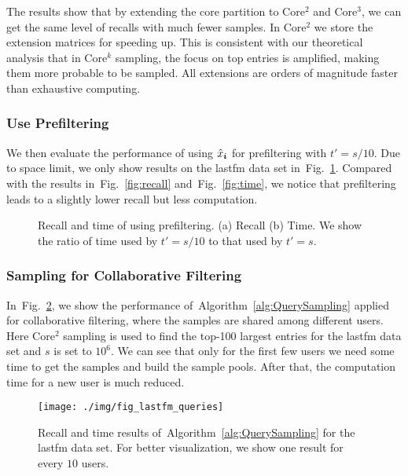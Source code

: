 \documentclass[10pt,journal,compsoc]{IEEEtran}
\newcommand{\V}[1]{{\boldsymbol{{\MakeLowercase{#1}}}}}
\newcommand{\predx}{\hat{x}_{\V{i}}}
\newcommand{\Fig}[1]{Fig.~\ref{fig:#1}}
\newcommand{\Alg}[1]{Algorithm~\ref{alg:#1}}
\begin{document}
The results show that by extending the core partition to Core$^2$ and Core$^3$,
we can get the same level of recalls with much fewer samples.
In Core$^2$ we store the extension matrices for speeding up.
This is consistent with our theoretical analysis that in Core$^k$ sampling,
the focus on top entries is amplified,
making them more probable to be sampled.
All extensions are orders of magnitude faster than exhaustive computing.

\subsubsection{Use Prefiltering}
We then evaluate the performance of using $\predx$ for prefiltering with $t'=s/10$.
Due to space limit, we only show results on the lastfm data set in~\Fig{lastfm_budget}.
Compared with the results in~\Fig{recall} and~\Fig{time},
we notice that prefiltering leads to a slightly lower recall but less computation.
\begin{figure}[H]
	\centering
	\qquad
	\caption{Recall and time of using prefiltering.
		(a) Recall (b) Time.
		We show the ratio of time used by $t'=s/10$ to that used by $t'=s$.}
	\label{fig:lastfm_budget}
\end{figure}
\subsubsection{Sampling for Collaborative Filtering}
In~\Fig{Queries}, we show the performance of~\Alg{QuerySampling}
applied for collaborative filtering,
where the samples are shared among different users.
Here Core$^2$ sampling is used to find the top-100 largest entries for the lastfm data set
and $s$ is set to $10^6$.
We can see that only for the first few users we need some time to get the samples
and build the sample pools.
After that, the computation time for a new user is much reduced.
\begin{figure}[!]
	\centering
	\texttt{[image: ./img/fig\_lastfm\_queries]}\\
	\caption{Recall and time results of~\Alg{QuerySampling} for the lastfm data set.
		For better visualization, we show one result for every $10$ users.}
	\label{fig:Queries}
\end{figure}
\end{document}
